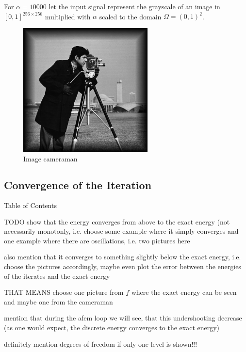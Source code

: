 \begin{frame}
  For $\alpha = 10000$ let the input signal represent the grayscale of an image
  in $[0,1]^{256\times 256}$ multiplied with $\alpha$ scaled to the domain
  $\Omega=(0,1)^2$.

  \begin{figure}[!ht]
    \centering
    \includegraphics[width=.5\linewidth]
      {pictures/experiments/settings/images/f2bcameraman.png}
    \caption*{Image cameraman}
  \end{figure}
\end{frame}

\subsection{Convergence of the Iteration}
\begin{frame}[noframenumbering]{Table of Contents}
\end{frame}

\begin{frame}{TODO}
  show that the energy converges from above to the exact energy (not
  necessarily monotonly, i.e. choose some example where it simply converges
  and one example where there are oscillations, i.e. two pictures here

  also mention that it converges to something slightly below the exact energy,
  i.e. choose the pictures accordingly, maybe even plot the error between
  the energies of the iterates and the exact energy

  THAT MEANS choose one picture from $f$ where the exact energy can be seen 
  and maybe one from the cameraman

  mention that during the afem loop we will see, that this undershooting 
  decrease (as one would expect, the discrete energy converges to the exact
  energy)
  
  definitely mention degrees of freedom if only one level is shown!!!
\end{frame}

